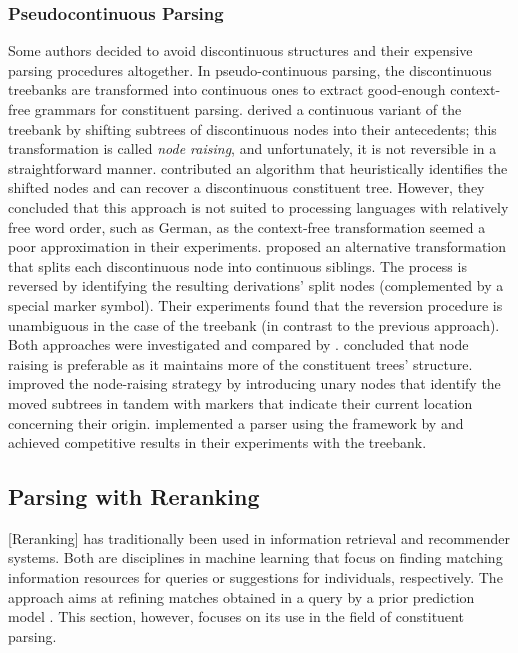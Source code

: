 \documentclass[../document.tex]{subfiles}
\begin{document}
    \subsubsection*{Pseudocontinuous Parsing}
    Some authors decided to avoid discontinuous structures and their expensive parsing procedures altogether.
    In pseudo-continuous parsing, the discontinuous treebanks are transformed into continuous ones to extract good-enough context-free grammars for constituent parsing.
     derived a continuous variant of the \negra{} treebank by shifting subtrees of discontinuous nodes into their antecedents; this transformation is called \emph{node raising}, and unfortunately, it is not reversible in a straightforward manner.
     contributed an algorithm that heuristically identifies the shifted nodes and can recover a discontinuous constituent tree.
    However, they concluded that this approach is not suited to processing languages with relatively free word order, such as German, as the context-free transformation seemed a poor approximation in their experiments.
     proposed an alternative transformation that splits each discontinuous node into continuous siblings.
    The process is reversed by identifying the resulting derivations' split nodes (complemented by a special marker symbol).
    Their experiments found that the reversion procedure is unambiguous in the case of the \tiger{} treebank (in contrast to the previous approach).
    Both approaches were investigated and compared by \citet{hsu2010comparing}.
     concluded that node raising is preferable as it maintains more of the constituent trees' structure.
     improved the node-raising strategy by introducing unary nodes that identify the moved subtrees in tandem with markers that indicate their current location concerning their origin.
    \citeauthor{Ver16} implemented a parser using the  framework by \citet{Petrov06} and achieved competitive results in their experiments with the \tiger{} treebank.

    \subsection{Parsing with Reranking}\label{sec:references:reranking}
    [Reranking] has traditionally been used in information retrieval and recommender systems.
    Both are disciplines in machine learning that focus on finding matching information resources for queries or suggestions for individuals, respectively.
    The approach aims at refining matches obtained in a query by a prior prediction model \citep{carbonell1998use,adomavicius2009toward}.
    This section, however, focuses on its use in the field of constituent parsing.
\end{document}
